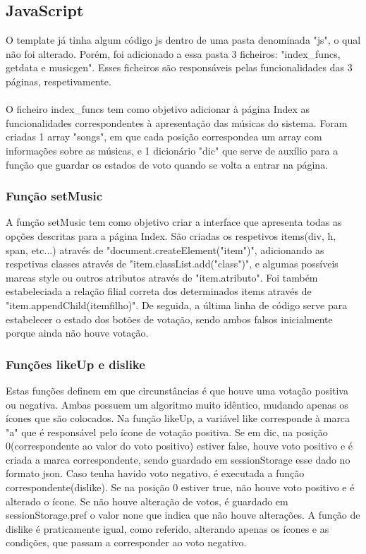\documentclass{report}
\begin{document}
\subsection{JavaScript}
\hspace{5pt}O template já tinha algum código \ac{js} dentro de uma pasta denominada "js", o 
qual não foi alterado. Porém, foi adicionado a essa pasta 3 ficheiros: "index\_funcs, getdata 
e musicgen". Esses ficheiros são responsáveis pelas funcionalidades das 3 páginas, respetivamente. 
\paragraph{}
\hspace{5pt}O ficheiro index\_funcs tem como objetivo adicionar à página Index as funcionalidades 
correspondentes à apresentação das músicas do sistema.
Foram criadas 1 array "songs", em que cada posição correspondea  um array com informações sobre 
as músicas,  e 1 dicionário "dic" que serve de auxílio para a função que guardar os estados de 
voto quando se volta a entrar na página.

\subsubsection{Função setMusic}
\hspace{5pt}A função setMusic tem como objetivo criar a interface que apresenta todas as opções 
descritas para a página Index. São criadas os respetivos items(div, h, span, etc...) através de 
"document.createElement("item")", adicionando as respetivas classes através de "item.classList.add("class")", 
e algumas possíveis marcas style ou outros atributos através de "item.atributo". Foi também 
estabeleciada a relação filial correta dos determinados items através de "item.appendChild(itemfilho)". 
De seguida, a última linha de código serve para estabelecer o estado dos botões de votação, sendo 
ambos falsos inicialmente porque ainda não houve votação.

\subsubsection{Funções likeUp e dislike}
\hspace{5pt}Estas funções definem em que circunstâncias é que houve uma votação positiva ou negativa. 
Ambas possuem um algoritmo muito idêntico, mudando apenas os ícones que são colocados. Na função likeUp, 
a variável like corresponde à marca "a" que é responsável pelo ícone de votação positiva. Se em dic, 
na posição 0(correspondente ao valor do voto positivo) estiver false, houve voto positivo e é criada 
a marca correspondente, sendo guardado em sessionStorage esse dado no formato \ac{json}. Caso tenha 
havido voto negativo, é executada a função correspondente(dislike). Se na posição 0 estiver true, não 
houve voto positivo e é alterado o ícone. Se não houve alteração de votos, é guardado em sessionStorage.pref 
o valor none que indica que não houve alterações. A função de dislike é praticamente igual, como referido, 
alterando apenas os ícones e as condições, que passam a corresponder ao voto negativo.
\end{document}
